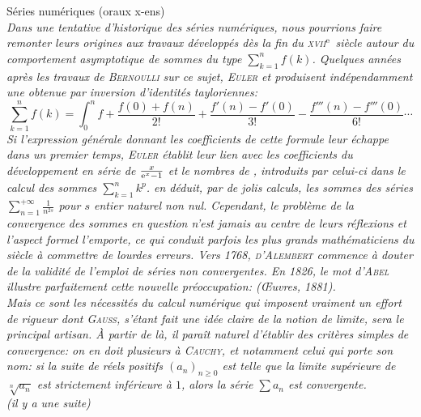 Séries numériques (oraux x-ens)\\
\textsl{
Dans une tentative d'historique des séries numériques, nous pourrions faire remonter leurs origines aux travaux développés dès la fin du \textsc{xvii}$^{\mathrm{e}}$ siècle autour du comportement asymptotique de sommes du type $\sum\limits_{k=1}^n f(k)$. Quelques années après les travaux de \textsc{Bernoulli} sur ce sujet, \textsc{Euler} et  produisent indépendamment une  obtenue par inversion d'identités tayloriennes:
$$\sum_{k=1}^n f(k) = \int_0^n f + \frac{f(0) + f(n)}{2!} + \frac{f'(n) - f'(0)}{3!} - \frac{f'''(n) - f'''(0)}{6!}\cdots$$
Si l'expression générale donnant les coefficients de cette formule leur échappe dans un premier temps, \textsc{Euler} établit leur lien avec les coefficients du développement en série de $\frac{x}{\mathrm{e}^x-1}$ et le nombres de , introduits par celui-ci dans le calcul des sommes $\sum\limits_{k=1}^n k^p$.  en déduit, par de jolis calculs, les sommes des séries $\sum\limits_{n=1}^{+\infty} \frac{1}{n^{2s}}$ pour $s$ entier naturel non nul.
Cependant, le problème de la convergence des sommes en question n'est jamais au centre de leurs réflexions et l'aspect formel l'emporte, ce qui conduit parfois les plus grands mathématiciens du siècle à commettre de lourdes erreurs. Vers 1768, \textsc{d'Alembert} commence à douter de la validité de l'emploi de séries non convergentes. En 1826, le mot d'\textsc{Abel} illustre parfaitement cette nouvelle préoccupation:  (Œuvres, 1881). \\
Mais ce sont les nécessités du calcul numérique qui imposent vraiment un effort de rigueur dont \textsc{Gauss}, s'étant fait une idée claire de la notion de limite, sera le principal artisan. À partir de là, il paraît naturel d'établir des critères simples de convergence: on en doit plusieurs à \textsc{Cauchy}, et notamment celui qui porte son nom: si la suite de réels positifs $(a_n)_{n \geqslant 0}$ est telle que la limite supérieure de $\sqrt[n]{a_n}$ est strictement inférieure à $1$, alors la série $\sum a_n$ est convergente. \\
(il y a une suite)
}